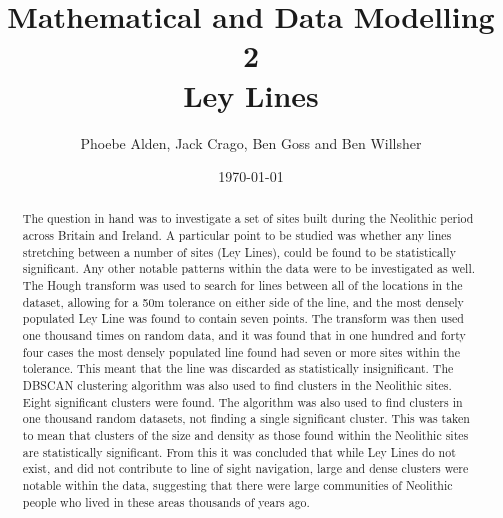 \documentclass[a4paper]{article}
\title{Mathematical and Data Modelling 2 \\ Ley Lines}
\author{Phoebe Alden, Jack Crago, Ben Goss and Ben Willsher}
\date{\today}
\begin{document}

\maketitle

\pagebreak

\begin{abstract}
\noindent
The question in hand was to investigate a set of sites built during the Neolithic period across Britain and Ireland. A particular point to be studied was whether any lines stretching between a number of sites (Ley Lines), could be found to be statistically significant. Any other notable patterns within the data were to be investigated as well.
\newline\newline
The Hough transform was used to search for lines between all of the locations in the dataset, allowing for a 50m tolerance on either side of the line, and the most densely populated Ley Line was found to contain seven points. The transform was then used one thousand times on random data, and it was found that in one hundred and forty four cases the most densely populated line found had seven or more sites within the tolerance. This meant that the line was discarded as statistically insignificant.
\newline\newline
The DBSCAN clustering algorithm was also used to find clusters in the Neolithic sites. Eight significant clusters were found. The algorithm was also used to find clusters in one thousand random datasets, not finding a single significant cluster. This was taken to mean that clusters of the size and density as those found within the Neolithic sites are statistically significant.
\newline\newline
From this it was concluded that while Ley Lines do not exist, and did not contribute to line of sight navigation, large and dense clusters were notable within the data, suggesting that there were large communities of Neolithic people who lived in these areas thousands of years ago.
\end{abstract}

\clearpage

\tableofcontents

\clearpage

\end{document}
